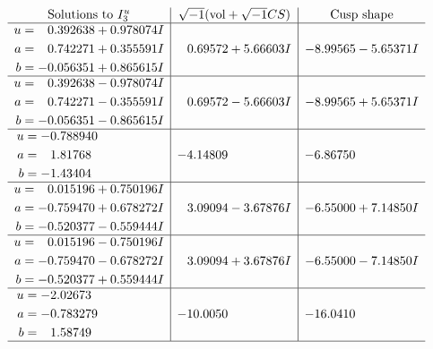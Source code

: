 \documentclass[1p]{elsarticle_modified}
\theoremstyle{definition}
\newcommand{\I}{\sqrt{-1}}
\begin{document}
$$\begin{array}{c|c|c}  
\text{Solutions to }I^u_{3}& \I (\text{vol} + \sqrt{-1}CS) & \text{Cusp shape}\\
 \hline 
\begin{aligned}
u &= \phantom{-}0.392638 + 0.978074 I \\
a &= \phantom{-}0.742271 + 0.355591 I \\
b &= -0.056351 + 0.865615 I\end{aligned}
 & \phantom{-}0.69572 + 5.66603 I & -8.99565 - 5.65371 I \\ \hline\begin{aligned}
u &= \phantom{-}0.392638 - 0.978074 I \\
a &= \phantom{-}0.742271 - 0.355591 I \\
b &= -0.056351 - 0.865615 I\end{aligned}
 & \phantom{-}0.69572 - 5.66603 I & -8.99565 + 5.65371 I \\ \hline\begin{aligned}
u &= -0.788940\phantom{ +0.000000I} \\
a &= \phantom{-}1.81768\phantom{ +0.000000I} \\
b &= -1.43404\phantom{ +0.000000I}\end{aligned}
 & -4.14809\phantom{ +0.000000I} & -6.86750\phantom{ +0.000000I} \\ \hline\begin{aligned}
u &= \phantom{-}0.015196 + 0.750196 I \\
a &= -0.759470 + 0.678272 I \\
b &= -0.520377 - 0.559444 I\end{aligned}
 & \phantom{-}3.09094 - 3.67876 I & -6.55000 + 7.14850 I \\ \hline\begin{aligned}
u &= \phantom{-}0.015196 - 0.750196 I \\
a &= -0.759470 - 0.678272 I \\
b &= -0.520377 + 0.559444 I\end{aligned}
 & \phantom{-}3.09094 + 3.67876 I & -6.55000 - 7.14850 I \\ \hline\begin{aligned}
u &= -2.02673\phantom{ +0.000000I} \\
a &= -0.783279\phantom{ +0.000000I} \\
b &= \phantom{-}1.58749\phantom{ +0.000000I}\end{aligned}
 & -10.0050\phantom{ +0.000000I} & -16.0410\phantom{ +0.000000I}\\
 \hline 
 \end{array}$$\newpage\newpage\renewcommand{\arraystretch}{1}
\end{document}
